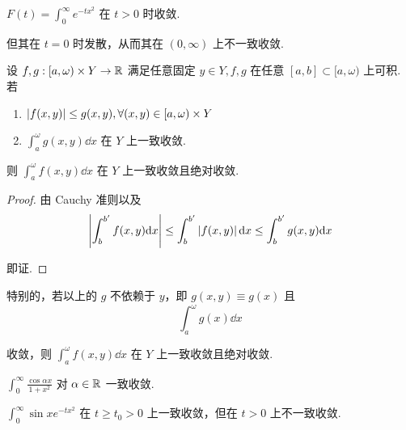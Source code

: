 \begin{example}
    $F(t)=\displaystyle\int_0^\infty e^{-tx^2}$ 在 $t>0$ 时收敛.
    
    但其在 $t=0$ 时发散，从而其在 $(0,\infty)$ 上不一致收敛.
\end{example}


\begin{property}
    设 $f,g:[a,\omega)\times Y\to\mathbb{R}$ 满足任意固定 $y\in Y,f,g$ 在任意 $[a,b]\subset[a,\omega)$ 上可积. 若

    \begin{enumerate}
        \item $\left\lvert{f(x,y)}\right\rvert\le g(x,y),\forall (x,y)\in [a,\omega)\times Y$
        
        \item $\displaystyle\int_a^\omega g(x,y)\dd x$ 在 $Y$ 上一致收敛.
    \end{enumerate}

    则 $\displaystyle\int_a^\omega f(x,y)\dd x$ 在 $Y$ 上一致收敛且绝对收敛.
\end{property}
\begin{proof}
    由 Cauchy 准则以及
$$
\left\lvert{\int_b^{b'}f(x,y)\mathrm{d}x}\right\rvert\le\int_b^{b'}\left\lvert{f(x,y)}\right\rvert\mathrm{d} x\le\int_b^{b'}g(x,y)\mathrm{d} x
$$

    即证.
\end{proof}


特别的，若以上的 $g$ 不依赖于 $y$，即 $g(x,y)\equiv g(x)$ 且
$$
\int_a^\omega g(x)\dd x
$$

收敛，则 $\displaystyle\int_a^\omega f(x,y)\dd x$ 在 $Y$ 上一致收敛且绝对收敛.

\begin{example}
    $\displaystyle\int_0^\infty\frac{\cos\alpha x}{1+x^2}$ 对 $\alpha\in\mathbb{R}$ 一致收敛.
\end{example}

\begin{example}
    $\displaystyle\int_0^\infty\sin xe^{-tx^2}$ 在 $t\ge t_0>0$ 上一致收敛，但在 $t>0$ 上不一致收敛.
\end{example}

